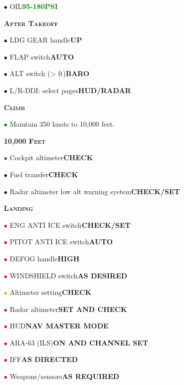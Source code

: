 \documentclass[a4paper,12pt,dvipsnames]{letter}
\newcommand{\button}[1]{\textbf{#1}}
\newcommand{\ok}[1]{\textcolor{Green}{\textbf{#1}}}
\newcommand{\myHead}[1]{{\LARGE\textsc{\textbf{#1}}}}
\newcommand{\myhead}[1]{{\Large\textsc{\textbf{#1}}}}
\newcommand{\bi}{\textcolor{ProcessBlue}{$\bullet$\;}}
\newcommand{\ri}{\textcolor{Red}{$\bullet$\;}}
\newcommand{\gi}{\textcolor{Green}{$\bullet$\;}}
\newcommand{\oi}{\textcolor{Orange}{$\bullet$\;}}
\renewcommand{\ni}{\textcolor{Brown}{$\bullet$\;}}
\begin{document}
{\begin{itemize}
\begin{itemize}
  \item[\bi] OIL\dotfill\ok{95-180\;PSI}
 \end{itemize}
\end{itemize} 
\vspace{0.5em}
\begin{itemize}
 \item[] \myHead{After Takeoff}
 \item[\bi] LDG GEAR handle\dotfill\button{UP}
 \item[\bi] FLAP switch\dotfill\button{AUTO}
 \item[\bi] ALT switch (> ft)\dotfill\button{BARO}
 \item[\bi] L/R-DDI: select pages\dotfill\button{HUD/RADAR}
\end{itemize}
\newpage
\begin{itemize}
 \item[] \myHead{Climb}
 \item[\gi] Maintain 350 knots to 10,000 feet.
 \vspace{0.3em}
 \item[] \myhead{10,000 Feet}
 \item[\ni] Cockpit altimeter\dotfill\button{CHECK}
 \item[\bi] Fuel transfer\dotfill\button{CHECK}
 \item[\bi] Radar altimeter low alt warning system\dotfill\button{CHECK/SET}
\end{itemize}
\vspace{0.5em}
\begin{itemize}
 \item[] \myHead{Landing}
 \item[\ri] ENG ANTI ICE switch\dotfill\button{CHECK/SET}
 \item[\ri] PITOT ANTI ICE switch\dotfill\button{AUTO}
 \item[\ri] DEFOG handle\dotfill\button{HIGH}
 \item[\ri] WINDSHIELD switch\dotfill\button{AS DESIRED}
 \item[\oi] Altimeter setting\dotfill\button{CHECK}
 \item[\ni] Radar altimeter\dotfill\button{SET AND CHECK}
 \item[\ri] HUD\dotfill\button{NAV MASTER MODE}
 \item[\ri] ARA-63 (ILS)\dotfill\button{ON AND CHANNEL SET}
 \item[\ri] IFF\dotfill\button{AS DIRECTED}
 \item[\ri] Weapons/sensors\dotfill\button{AS REQUIRED}
\end{itemize} 
%
}
\end{document}
